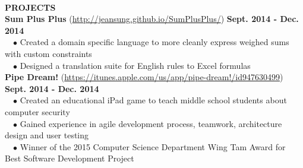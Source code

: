 \documentclass[11.5pt]{article}
\newcommand{\wrapTitle}[1]{{\sectionNL \textbf{\Large #1}} \sectionNL}
\newcommand{\sectionNL}{~\\[1pt]}
\newcommand{\customtab}{$\hspace{10pt} \bullet \hspace{2pt}$}
\newcommand{\JudgeNudge}{\hspace{4pt}}
\newcommand{\rightAlign}{\hfill}
\begin{document}
\begin{flushleft}
\wrapTitle{PROJECTS}
\textbf{Sum Plus Plus} (\url{http://jeansung.github.io/SumPlusPlus/}) \rightAlign \textbf{Sept. 2014 - Dec. 2014} \\
\customtab Created a domain specific language to more cleanly express weighed sums with custom constraints \\
\customtab Designed a translation suite for English rules to Excel formulas \\

\textbf{Pipe Dream!} (\url{https://itunes.apple.com/us/app/pipe-dream!/id947630499})  \rightAlign \textbf{Sept. 2014 - Dec. 2014} \\
\customtab Created an educational iPad game to teach middle school students about computer security\\
\customtab Gained experience in agile development process, teamwork, architecture design and user testing \\
\customtab Winner of the 2015 Computer Science Department Wing Tam Award for Best Software Development Project 


 


\end{flushleft}
\end{document}
